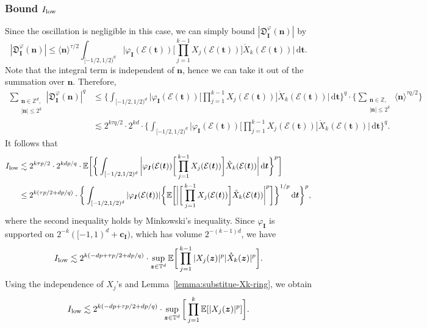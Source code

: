 \documentclass[12pt]{amsart}
\theoremstyle{definition}
\theoremstyle{remark}
\newcommand{\bt}{\boldsymbol{t}}
\newcommand{\bz}{\boldsymbol{z}}
\newcommand{\Z}{\mathbb{Z}}
\newcommand{\E}{\mathbb{E}}
\newcommand{\T}{\mathbb{T}}
\numberwithin{equation}{section}
\begin{document}
\subsubsection{Bound $I_{\textnormal{low}}$}
Since the oscillation is negligible in this case, we can simply bound $|\mathfrak{D}_{\boldsymbol{I}}^\varphi(\boldsymbol{n})|$ by
\[
	|\mathfrak{D}_{\boldsymbol{I}}^\varphi(\boldsymbol{n})|\le \langle \boldsymbol{n}\rangle^{\tau/2}\int_{[-1/2,1/2)^d} \bigg|\varphi_{\boldsymbol{I}}(\mathcal{E}(\bt))\bigg[\prod_{j=1}^{k-1}X_j(\mathcal{E}(\bt))\bigg]\mathring{X}_k(\mathcal{E}(\bt))\bigg|\,\mathrm{d}\bt.
\]
Note that the integral term is independent of $\boldsymbol{n}$, hence we can take it out of the summation over $\boldsymbol{n}$. Therefore,
\begin{align*}
\sum_{\substack{\boldsymbol{n}\in \Z^d,\\|\boldsymbol{n}|\le 2^k}} |\mathfrak{D}_{\boldsymbol{I}}^\varphi (\boldsymbol{n})|^q&\le \bigg\{\int_{[-1/2,1/2)^d} \bigg|\varphi_{\boldsymbol{I}}(\mathcal{E}(\bt))\bigg[\prod_{j=1}^{k-1}X_j(\mathcal{E}(\bt))\bigg]\mathring{X}_k(\mathcal{E}(\bt))\bigg|\,\mathrm{d}\bt\bigg\}^q\cdot \bigg\{\sum_{\substack{\boldsymbol{n}\in \Z,\\|\boldsymbol{n}|\le 2^k}} \langle \boldsymbol{n}\rangle^{\tau q/2}\bigg\}\\
&\lesssim 2^{k\tau q/2}\cdot 2^{kd}\cdot \bigg\{\int_{[-1/2,1/2)^d} \bigg|\varphi_{\boldsymbol{I}}(\mathcal{E}(\bt))\bigg[\prod_{j=1}^{k-1}X_j(\mathcal{E}(\bt))\bigg]\mathring{X}_k(\mathcal{E}(\bt))\bigg|\,\mathrm{d}\bt\bigg\}^q. 
\end{align*}
It follows that
\begin{align*}
I_{\textnormal{low}}&\lesssim 2^{k\tau p/2}\cdot 2^{kdp/q}\cdot \E\bigg[\bigg\{\int_{[-1/2,1/2)^d} \bigg|\varphi_{\boldsymbol{I}}(\mathcal{E}(\bt))\bigg[\prod_{j=1}^{k-1}X_j(\mathcal{E}(\bt))\bigg]\mathring{X}_k(\mathcal{E}(\bt))\bigg|\,\mathrm{d}\bt\bigg\}^p\bigg]\\
&\le 2^{k(\tau p/2+dp/q)}\cdot \bigg\{\int_{[-1/2,1/2)^d} |\varphi_{\boldsymbol{I}}(\mathcal{E}(\bt))|\bigg\{\E\bigg[\bigg|\bigg[\prod_{j=1}^{k-1}X_j(\mathcal{E}(\bt))\bigg]\mathring{X}_k(\mathcal{E}(\bt))\bigg|^p\bigg]\bigg\}^{1/p}\,\mathrm{d}\bt\bigg\}^p,
\end{align*}
where the second inequality holds by Minkowski's inequality. Since $\varphi_{\boldsymbol{I}}$ is supported on $2^{-k}([-1,1)^d+\boldsymbol{c_I})$, which has volume $2^{-(k-1)d}$, we have
\[
I_{\textnormal{low}}\lesssim 2^{k(-dp+\tau p/2+dp/q)}\cdot \sup_{\bz\in \T^d}\E\bigg[\prod_{j=1}^{k-1} |X_j(\bz)|^p |\mathring{X}_k(\bz)|^p\bigg].
\]
Using the independence of $X_j$'s and Lemma~\ref{lemma:substitue-Xk-ring}, we obtain
\begin{equation}\label{eq:bound-I-low}
I_{\textnormal{low}}\lesssim 2^{k(-dp+\tau p/2+dp/q)}\cdot \sup_{\bz\in \T^d}\bigg[\prod_{j=1}^{k}\E[|X_j(\bz)|^p]\bigg].
\end{equation}
\end{document}
